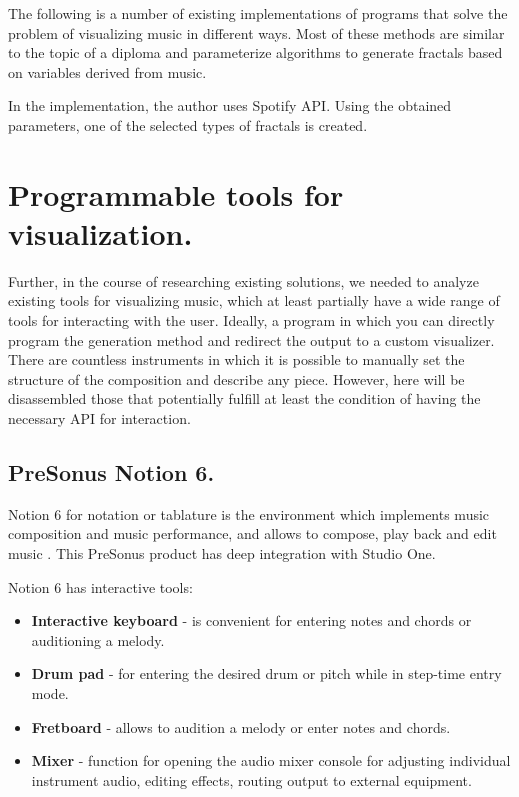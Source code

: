 \documentclass[thesis=B,english]{FITthesis}[2019/12/23]
\begin{document}
The following is a number of existing implementations of programs that solve the problem of visualizing music in different ways. Most of these methods are similar to the topic of a diploma and parameterize algorithms to generate fractals based on variables derived from music.

In the implementation, the author uses Spotify API. Using the obtained parameters, one of the selected types of fractals is created.

\section{Programmable tools for visualization.}

Further, in the course of researching existing solutions, we needed to analyze existing tools for visualizing music, which at least partially have a wide range of tools for interacting with the user. Ideally, a program in which you can directly program the generation method and redirect the output to a custom visualizer. There are countless instruments in which it is possible to manually set the structure of the composition and describe any piece. However, here will be disassembled those that potentially fulfill at least the condition of having the necessary API for interaction.

\subsection{PreSonus Notion 6.}

Notion 6 for notation or tablature is the environment which implements music composition and music performance, and allows to compose, play back and edit music \cite{PreSonusNotion6}. This PreSonus product has deep integration with Studio One.

Notion 6 has interactive tools:
\begin{itemize}
\item \textbf{Interactive keyboard} - is convenient for entering notes and chords or auditioning a melody.
\item \textbf{Drum pad} - for entering the desired drum or pitch while in step-time entry mode.
\item \textbf{Fretboard} - allows to audition a melody or enter notes and chords.
\item \textbf{Mixer} - function for opening the audio mixer console for adjusting individual instrument audio, editing effects, routing output to external equipment.
\end{itemize}
\end{document}
